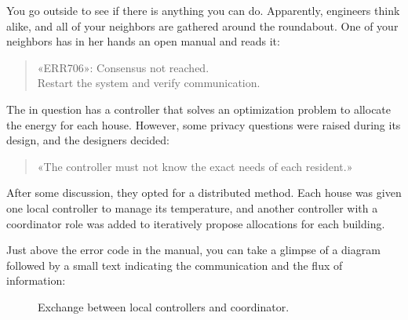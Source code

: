 \documentclass[../main.tex]{subfiles}
\begin{document}
You go outside to see if there is anything you can do.
Apparently, engineers think alike, and all of your neighbors are gathered around the roundabout.
One of your neighbors has in her hands an open manual and reads it:
\begin{quote}
  «ERR706»: Consensus not reached.\\
  Restart the system and verify communication.
\end{quote}

The \dhn{} in question has a controller that solves an optimization problem to allocate the energy for each house.
However, some privacy questions were raised during its design, and the designers decided:
\begin{quote}
  «The controller must not know the exact needs of each resident.»
\end{quote}

After some discussion, they opted for a distributed method.
Each house was given one local controller to manage its temperature, and another controller with a coordinator role was added to iteratively propose allocations for each building.

Just above the error code in the manual, you can take a glimpse of a diagram followed by a small text indicating the communication and the flux of information:
\begin{figure}[H]
  \centering
  \caption{Exchange between local controllers and coordinator.}\label{fig:ex_exchange_agents}
\end{figure}
\end{document}
